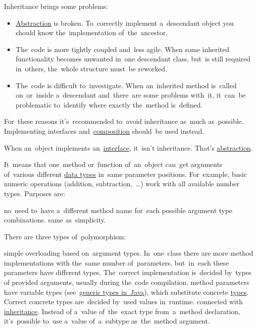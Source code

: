 \warning Inheritance brings some problems:
\begin{itemize}
    \item \hyperref[abstraction]{Abstraction} is broken.
          To~correctly implement a~descendant object you should know the~implementation of~the~ancestor.
    \item The~code is more tightly coupled and~less agile.
          When some inherited functionality becomes unwanted in~one descendant class, but~is still required in~others, the~whole structure must~be reworked.
    \item The~code is difficult to~investigate.
          When an~inherited method is~called on~or~inside a~descendant and~there~are some problems with~it, it~can~be problematic to~identify where exactly the~method is~defined.
\end{itemize}
For~these reasons it's~recommended to~avoid inheritance as~much as~possible.
Implementing interfaces and~\hyperref[compositionoverinheritance]{composition} should~be used instead.

\warning When an~object implements an~\hyperref[javainterface]{interface}, it~isn't inheritance.
That's \hyperref[abstraction]{abstraction}.

\label{polymorphism}
It~means that one~method or~function of~an~object can~get arguments of~various different \hyperref[datatypes]{data types} in~same parameter positions.
For~example, basic numeric operations (addition, subtraction,~\dots) work with all available number types.
Purposes are:
\begin{itemize}
     no~need to~have a~different method name for~each possible argument type combinations.
     same as~simplicity.
\end{itemize}
\newpage

\noindent There are three types of~polymorphism:
\begin{itemize}
     simple overloading based on~argument types.
             In~one~class there are more method implementations with the~same number of~parameters, but~in~each these parameters have different types.
             The~correct implementation is~decided by~types of provided arguments, usually during the~code compilation.
     method parameters have variable types (see~\hyperref[javagenerics]{generic types in~Java}), which substitute concrete \hyperref[datatypes]{types}.
             Correct concrete types are~decided by~used values in~runtime.
     connected with \hyperref[inheritance]{inheritance}.
             Instead of a~value of~the~exact type from~a~method declaration, it's~possible to~use a~value of~a~subtype as~the~method argument.
\end{itemize}

